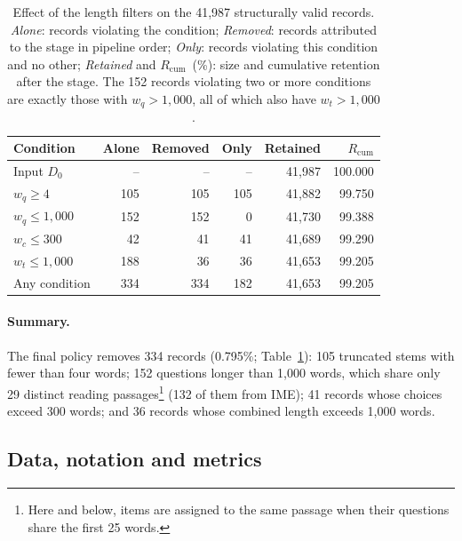 \begin{table}[t]
\centering
\footnotesize
\setlength{\tabcolsep}{4pt}
\begin{tabular}{@{}lrrrrr@{}}
\toprule
Condition & Alone & Removed & Only & Retained & $R_{\mathrm{cum}}$ \\
\midrule
Input $D_0$ & -- & -- & -- & 41,987 & 100.000 \\
\midrule
$w_q \ge 4$ & 105 & 105 & 105 & 41,882 & 99.750 \\
$w_q \le 1{,}000$ & 152 & 152 & 0 & 41,730 & 99.388 \\
$w_c \le 300$ & 42 & 41 & 41 & 41,689 & 99.290 \\
$w_t \le 1{,}000$ & 188 & 36 & 36 & 41,653 & 99.205 \\
\midrule
Any condition & 334 & 334 & 182 & 41,653 & 99.205 \\
\bottomrule
\end{tabular}
\caption{Effect of the length filters on the 41,987 structurally valid
records. \emph{Alone}: records violating the condition; \emph{Removed}:
records attributed to the stage in pipeline order; \emph{Only}: records
violating this condition and no other; \emph{Retained} and
$R_{\mathrm{cum}}$~(\%): size and cumulative retention after the stage. The
152 records violating two or more conditions are exactly those with
$w_q > 1{,}000$, all of which also have $w_t > 1{,}000$.}
\label{tab:len-overview}
\end{table}

\paragraph{Summary.} The final policy removes 334 records (0.795\%;
Table~\ref{tab:len-overview}): 105 truncated stems with fewer than four words;
152 questions longer than 1,000 words, which share only 29 distinct reading
passages\footnote{Here and below, items are assigned to the same passage when
their questions share the first 25 words.} (132 of them from IME); 41 records
whose choices exceed 300 words; and 36 records whose combined length exceeds
1,000 words.

\subsection{Data, notation and metrics}
\label{app:len-setup}

